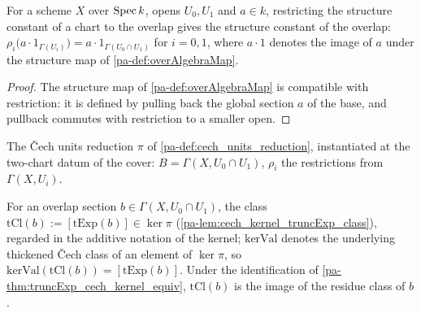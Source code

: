 \begin{lemma}
  \label{pa-lem:resHom_overAlgebraMap}
  \leanok

  For a scheme \(X\) over \(\operatorname{Spec} k\), opens \(U_0, U_1\) and \(a \in k\), restricting
  the structure constant of a chart to the overlap gives the structure constant of the
  overlap: \(\rho_i\bigl(a \cdot 1_{\Gamma(U_i)}\bigr) = a \cdot
  1_{\Gamma(U_0 \cap U_1)}\) for \(i = 0, 1\), where \(a \cdot 1\) denotes the image of
  \(a\) under the structure map of \ref{pa-def:overAlgebraMap}.
\end{lemma}
\begin{proof}
  \leanok
  The structure map of \ref{pa-def:overAlgebraMap} is compatible with restriction: it is
  defined by pulling back the global section \(a\) of the base, and pullback commutes
  with restriction to a smaller open.
\end{proof}

\begin{definition}
  \label{pa-def:twoCover_unitsReduction}
  \leanok

  The \v{C}ech units reduction \(\pi\) of \ref{pa-def:cech_units_reduction}, instantiated
  at the two-chart datum of the cover: \(B = \Gamma(X, U_0 \cap U_1)\),
  \(\rho_i\) the restrictions from \(\Gamma(X, U_i)\).
\end{definition}

\begin{definition}
  \label{pa-def:twoCover_truncExpClass}
  \leanok

  For an overlap section \(b \in \Gamma(X, U_0 \cap U_1)\), the class
  \(\mathrm{tCl}(b) := [\mathrm{tExp}(b)] \in \ker \pi\)
  (\ref{pa-lem:cech_kernel_truncExp_class}), regarded in the additive notation of the
  kernel; \(\mathrm{kerVal}\) denotes the underlying thickened \v{C}ech class of an
  element of \(\ker \pi\), so \(\mathrm{kerVal}(\mathrm{tCl}(b)) =
  [\mathrm{tExp}(b)]\). Under the identification of
  \ref{pa-thm:truncExp_cech_kernel_equiv}, \(\mathrm{tCl}(b)\) is the image of the residue
  class of \(b\).
\end{definition}

